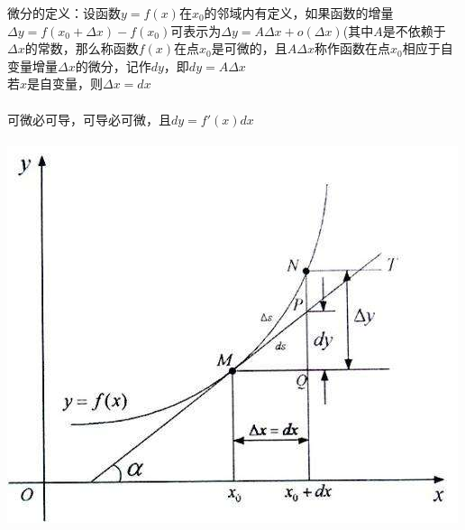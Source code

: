 \documentclass{article}
\begin{document}
\begin{flushleft}
	微分的定义：设函数$y=f(x)$在$x_0$的邻域内有定义，如果函数的增量$\Delta y = f(x_0 + \Delta x) − f(x_0)$可表示为$ \Delta y = A\Delta x + o(\Delta x)$(其中$A$是不依赖于$\Delta x$的常数，那么称函数$f(x)$在点$x_0$是可微的，且$A\Delta x$称作函数在点$x_0$相应于自变量增量$\Delta x$的微分，记作$dy$，即$dy = A\Delta x$\\
	若$x$是自变量，则$\Delta x=dx$\\
	~\\
	可微必可导，可导必可微，且$dy=f'(x)dx$\\
	~\\
	\includegraphics[scale=1.0]{1.jpg}
	
\end{flushleft}
\end{document}
